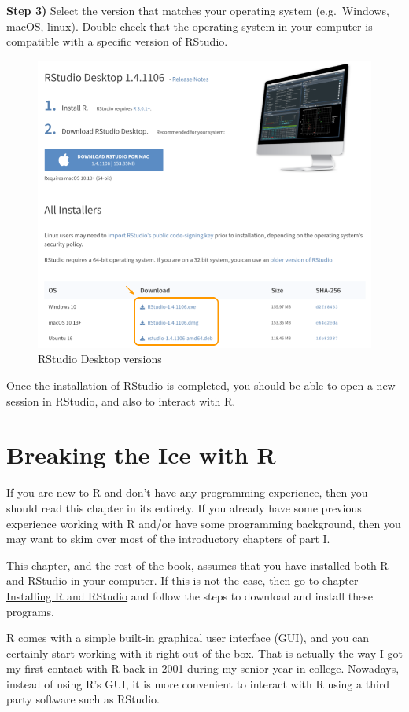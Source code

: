 \documentclass[
]{book}
\begin{document}
\textbf{Step 3)} Select the version that matches your operating system (e.g.~Windows,
macOS, linux). Double check that the operating system in your computer
is compatible with a specific version of RStudio.

\begin{figure}

{\centering \includegraphics[width=0.6\linewidth]{images/install/rstudio-versions} 

}

\caption{RStudio Desktop versions}\label{fig:unnamed-chunk-12}
\end{figure}

Once the installation of RStudio is completed, you should be able to open a new
session in RStudio, and also to interact with R.

\hypertarget{rintro}{%
\chapter{Breaking the Ice with R}\label{rintro}}

If you are new to R and don't have any programming experience, then you
should read this chapter in its entirety. If you already have some previous
experience working with R and/or have some programming background, then you may
want to skim over most of the introductory chapters of part I.

This chapter, and the rest of the book, assumes that you have installed both R
and RStudio in your computer. If this is not the case, then go to chapter
\protect\hyperlink{install}{Installing R and RStudio} and follow the steps to download
and install these programs.

R comes with a simple built-in graphical user interface (GUI), and you can
certainly start working with it right out of the box. That is actually the way
I got my first contact with R back in 2001 during my senior year in college.
Nowadays, instead of using R's GUI, it is more convenient to interact with R
using a third party software such as RStudio.
\end{document}
